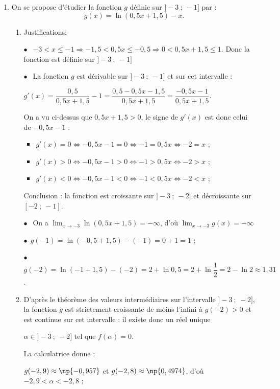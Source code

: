 \begin{enumerate}
\begin{enumerate}
$\displaystyle\lim_{n \to + \infty}u_n = -3$.
La suite $\left(u_n\right)$ converge vers $- 3$.
	\end{enumerate}
\item On se propose d'étudier la fonction $g$ définie sur $]-3~;~-1]$ par :
\[g(x) = \ln (0,5 x + 1,5) - x.\]
	\begin{enumerate}
		\item Justifications:
		
$\bullet~~$ $- 3 < x \leqslant - 1 \Rightarrow - 1,5 < 0,5x \leqslant - 0,5 \Rightarrow 0 < 0,5x + 1,5 \leqslant 1 $. Donc la fonction est définie sur $]- 3~;~- 1]$

$\bullet~~$ La fonction $g$ est dérivable sur $]- 3~;~- 1]$ et sur cet intervalle :

$g'(x) = \dfrac{0,5}{0,5x + 1,5} - 1 = \dfrac{0,5 - 0,5x - 1,5}{0,5x + 1,5} = \dfrac{-0,5x - 1}{0,5x + 1,5}$.

On a vu ci-dessus que $0,5x + 1,5 > 0$, le signe de $g'(x)$ est donc celui de $-0,5x - 1$ :

\begin{itemize}
\item $g'(x) = 0 \iff -0,5x - 1 = 0 \iff - 1 = 0,5x \iff - 2 = x$ ;
\item $g'(x) > 0 \iff -0,5x - 1 > 0 \iff - 1 > 0,5x \iff - 2 > x$ ;
\item $g'(x) < 0 \iff -0,5x - 1 < 0 \iff - 1 <0,5x \iff - 2 < x$ ;
\end{itemize}

Conclusion : la fonction est croissante sur $]-3~;~-2]$ et décroissante sur $[- 2~;~-1]$.

$\bullet~~$ On a $\displaystyle\lim_{x \to - 3} \ln (0,5 x + 1,5) = - \infty$, d'où $\displaystyle\lim_{x \to - 3}g(x) = - \infty$

$\bullet~~$$g(- 1) = \ln (-0,5 + 1,5) - (- 1) = 0 + 1 = 1$ ;

$\bullet~~$$g(-2) = \ln (- 1+ 1,5) - (- 2) = 2 + \ln 0,5 = 2 + \ln \dfrac12 = 2 - \ln 2 \approx 1,31$.
		\item D'après le théorème des valeurs intermédiaires sur l'intervalle $]- 3~;~- 2]$, la fonction $g$ est strictement croissante de moins l'infini à $g(-2) > 0$ et est continue sur cet intervalle : il existe donc un réel unique 

$\alpha \in ]- 3~;~-2]$ tel que $f(\alpha) = 0$.

La calculatrice donne :

$g(-2,9) \approx \np{- 0,957}$ et $g(-2,8) \approx \np{0,4974}$, d'où $-2,9 < \alpha < -2,8$ ;


\end{enumerate}
\end{enumerate}
